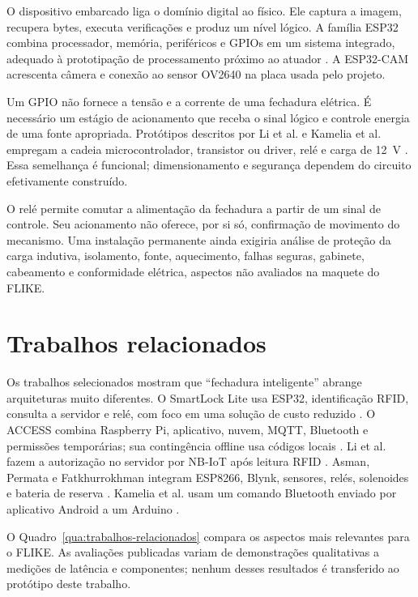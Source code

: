 O dispositivo embarcado liga o domínio digital ao físico. Ele captura a imagem, recupera bytes, executa verificações e produz um nível lógico. A família ESP32 combina processador, memória, periféricos e GPIOs em um sistema integrado, adequado à prototipação de processamento próximo ao atuador \cite{espressif2026esp32}. A ESP32-CAM acrescenta câmera e conexão ao sensor OV2640 na placa usada pelo projeto.

Um GPIO não fornece a tensão e a corrente de uma fechadura elétrica. É necessário um estágio de acionamento que receba o sinal lógico e controle energia de uma fonte apropriada. Protótipos descritos por Li et al. e Kamelia et al. empregam a cadeia microcontrolador, transistor ou driver, relé e carga de 12~V \cite{li2018intelligentlock,kamelia2014doorautomation}. Essa semelhança é funcional; dimensionamento e segurança dependem do circuito efetivamente construído.

O relé permite comutar a alimentação da fechadura a partir de um sinal de controle. Seu acionamento não oferece, por si só, confirmação de movimento do mecanismo. Uma instalação permanente ainda exigiria análise de proteção da carga indutiva, isolamento, fonte, aquecimento, falhas seguras, gabinete, cabeamento e conformidade elétrica, aspectos não avaliados na maquete do FLIKE.

\section{Trabalhos relacionados}

Os trabalhos selecionados mostram que ``fechadura inteligente'' abrange arquiteturas muito diferentes. O SmartLock Lite usa ESP32, identificação RFID, consulta a servidor e relé, com foco em uma solução de custo reduzido \cite{lima2022smartlocklite}. O ACCESS combina Raspberry Pi, aplicativo, nuvem, MQTT, Bluetooth e permissões temporárias; sua contingência offline usa códigos locais \cite{gadupu2021access}. Li et al. fazem a autorização no servidor por NB-IoT após leitura RFID \cite{li2018intelligentlock}. Asman, Permata e Fatkhurrokhman integram ESP8266, Blynk, sensores, relés, solenoides e bateria de reserva \cite{asman2019smartlock}. Kamelia et al. usam um comando Bluetooth enviado por aplicativo Android a um Arduino \cite{kamelia2014doorautomation}.

O Quadro~\ref{qua:trabalhos-relacionados} compara os aspectos mais relevantes para o FLIKE. As avaliações publicadas variam de demonstrações qualitativas a medições de latência e componentes; nenhum desses resultados é transferido ao protótipo deste trabalho.

